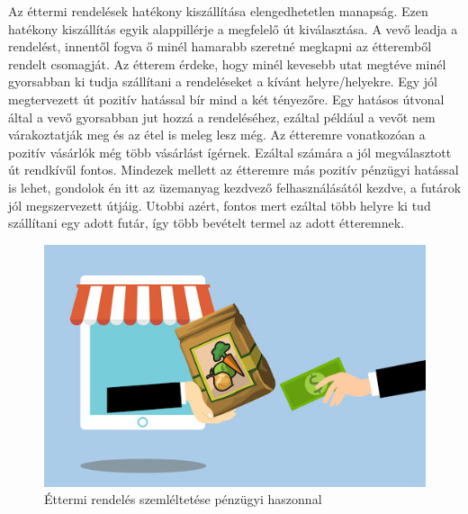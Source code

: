 
Az éttermi rendelések hatékony kiszállítása elengedhetetlen manapság. Ezen hatékony kiszállítás egyik alappillérje a megfelelő út kiválasztása. A vevő leadja a rendelést, innentől fogva ő minél hamarabb szeretné megkapni az étteremből rendelt csomagját. Az étterem érdeke, hogy minél kevesebb utat megtéve minél gyorsabban ki tudja szállítani a rendeléseket a kívánt helyre/helyekre. Egy jól megtervezett út pozitív hatással bír mind a két tényezőre. Egy hatásos útvonal által a vevő gyorsabban jut hozzá a rendeléséhez, ezáltal például a vevőt nem várakoztatják meg és az étel is meleg lesz még. Az étteremre vonatkozóan a pozitív vásárlók még több vásárlást ígérnek. Ezáltal számára a jól megválasztott út rendkívűl fontos. Mindezek mellett az étteremre más pozitív pénzügyi hatással is lehet, gondolok én itt az üzemanyag kezdvező felhasználásától kezdve, a futárok jól megszervezett útjáig. Utobbi azért, fontos mert ezáltal több helyre ki tud szállítani egy adott futár, így több bevételt termel az adott étteremnek.

\begin{figure}[h!]
\centering
\includegraphics[scale=0.7]{images/delivery.jpg}
\caption{Éttermi rendelés szemléltetése pénzügyi haszonnal}
\label{fig:delivery}
\end{figure}